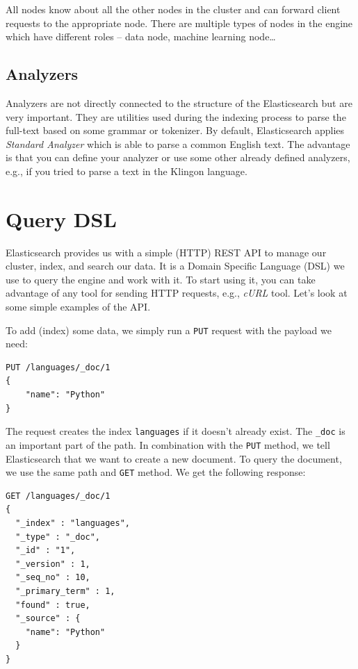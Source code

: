 \documentclass[12pt,a4,twoside]{article}
\newenvironment{code}{\captionsetup{type=listing, justification=centering}}{}
\begin{document}
All nodes know about all the other nodes in the cluster and can forward client requests to the appropriate node. There are multiple types of nodes in the engine which have different roles -- data node, machine learning node\dots

\subsection{Analyzers}

Analyzers are not directly connected to the structure of the Elasticsearch but are very important. They are utilities used during the indexing process to parse the full-text based on some grammar or tokenizer. By default, Elasticsearch applies \textit{Standard Analyzer} which is able to parse a common English text. The advantage is that you can define your analyzer or use some other already defined analyzers, e.g., if you tried to parse a text in the Klingon language.

\section{Query DSL}

Elasticsearch provides us with a simple (HTTP) REST API to manage our cluster, index, and search our data. It is a Domain Specific Language (DSL) we use to query the engine and work with it. To start using it, you can take advantage of any tool for sending HTTP requests, e.g., \textit{cURL} tool. Let's look at some simple examples of the API.

To add (index) some data, we simply run a \texttt{PUT} request with the payload we need:

\begin{code}
\begin{verbatim}
PUT /languages/_doc/1
{
    "name": "Python"
}
\end{verbatim}
\label{code:indexing}
\end{code}

The request creates the index \texttt{languages} if it doesn't already exist. The \texttt{\_doc} is an important part of the path. In combination with the \texttt{PUT} method, we tell Elasticsearch that we want to create a new document. To query the document, we use the same path and \texttt{GET} method. We get the following response:

\begin{code}
\begin{verbatim}
GET /languages/_doc/1
{
  "_index" : "languages",
  "_type" : "_doc",
  "_id" : "1",
  "_version" : 1,
  "_seq_no" : 10,
  "_primary_term" : 1,
  "found" : true,
  "_source" : {
    "name": "Python"
  }
}
\end{verbatim}
\label{code:query_data}
\end{code}
\end{document}
